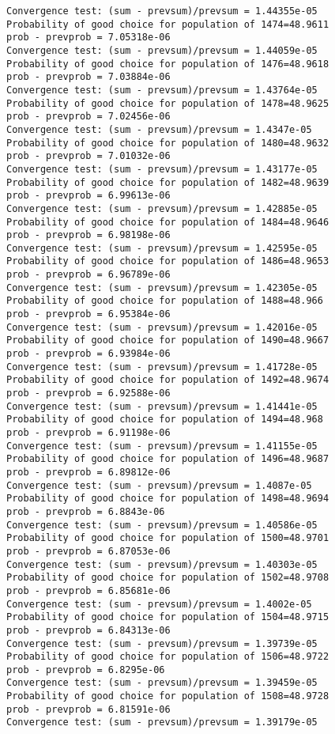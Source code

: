 \documentclass[11pt,onecolumn]{article}
\begin{document}
\begin{verbatim}
Convergence test: (sum - prevsum)/prevsum = 1.44355e-05
Probability of good choice for population of 1474=48.9611
prob - prevprob = 7.05318e-06
Convergence test: (sum - prevsum)/prevsum = 1.44059e-05
Probability of good choice for population of 1476=48.9618
prob - prevprob = 7.03884e-06
Convergence test: (sum - prevsum)/prevsum = 1.43764e-05
Probability of good choice for population of 1478=48.9625
prob - prevprob = 7.02456e-06
Convergence test: (sum - prevsum)/prevsum = 1.4347e-05
Probability of good choice for population of 1480=48.9632
prob - prevprob = 7.01032e-06
Convergence test: (sum - prevsum)/prevsum = 1.43177e-05
Probability of good choice for population of 1482=48.9639
prob - prevprob = 6.99613e-06
Convergence test: (sum - prevsum)/prevsum = 1.42885e-05
Probability of good choice for population of 1484=48.9646
prob - prevprob = 6.98198e-06
Convergence test: (sum - prevsum)/prevsum = 1.42595e-05
Probability of good choice for population of 1486=48.9653
prob - prevprob = 6.96789e-06
Convergence test: (sum - prevsum)/prevsum = 1.42305e-05
Probability of good choice for population of 1488=48.966
prob - prevprob = 6.95384e-06
Convergence test: (sum - prevsum)/prevsum = 1.42016e-05
Probability of good choice for population of 1490=48.9667
prob - prevprob = 6.93984e-06
Convergence test: (sum - prevsum)/prevsum = 1.41728e-05
Probability of good choice for population of 1492=48.9674
prob - prevprob = 6.92588e-06
Convergence test: (sum - prevsum)/prevsum = 1.41441e-05
Probability of good choice for population of 1494=48.968
prob - prevprob = 6.91198e-06
Convergence test: (sum - prevsum)/prevsum = 1.41155e-05
Probability of good choice for population of 1496=48.9687
prob - prevprob = 6.89812e-06
Convergence test: (sum - prevsum)/prevsum = 1.4087e-05
Probability of good choice for population of 1498=48.9694
prob - prevprob = 6.8843e-06
Convergence test: (sum - prevsum)/prevsum = 1.40586e-05
Probability of good choice for population of 1500=48.9701
prob - prevprob = 6.87053e-06
Convergence test: (sum - prevsum)/prevsum = 1.40303e-05
Probability of good choice for population of 1502=48.9708
prob - prevprob = 6.85681e-06
Convergence test: (sum - prevsum)/prevsum = 1.4002e-05
Probability of good choice for population of 1504=48.9715
prob - prevprob = 6.84313e-06
Convergence test: (sum - prevsum)/prevsum = 1.39739e-05
Probability of good choice for population of 1506=48.9722
prob - prevprob = 6.8295e-06
Convergence test: (sum - prevsum)/prevsum = 1.39459e-05
Probability of good choice for population of 1508=48.9728
prob - prevprob = 6.81591e-06
Convergence test: (sum - prevsum)/prevsum = 1.39179e-05

\end{verbatim}
\end{document}
